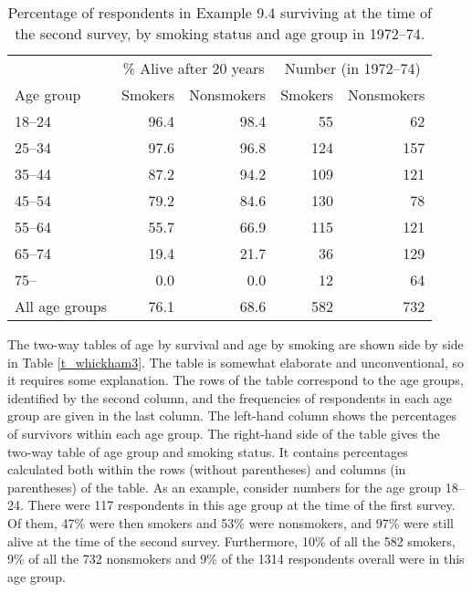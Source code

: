 \begin{table}[t]
\caption{Percentage of respondents in Example 9.4
surviving at the time of the second survey, by
smoking status and age group in 1972--74.}
\label{t_whickham2}
\begin{center}
\begin{tabular}{|l|rr|rr|}\hline
& \multicolumn{2}{|c|}{\% Alive after 20 years} &
 \multicolumn{2}{|c|}{Number (in 1972--74)} \\
Age group & Smokers & Nonsmokers & Smokers & Nonsmokers \\ \hline
18--24 & 96.4 & 98.4 & 55 & 62 \\
25--34 & 97.6 & 96.8 & 124 & 157 \\
35--44 & 87.2 & 94.2 & 109 & 121 \\
45--54 & 79.2 & 84.6 & 130 & 78 \\
55--64 & 55.7 & 66.9 & 115 & 121 \\
65--74 & 19.4 & 21.7 & 36 & 129 \\
75-- & 0.0 & 0.0 & 12 & 64 \\
\hline
All age groups & 76.1 & 68.6 & 582 & 732 \\ \hline
\end{tabular}
\end{center}
\vspace*{-2ex}
\end{table}

The two-way tables of age by survival and age by smoking are shown side
by side in Table \ref{t_whickham3}. The table is somewhat elaborate and
unconventional, so it requires some explanation. The rows of the table
correspond to the age groups, identified by the second column, and the
frequencies of respondents in each age group are given in the last
column. The left-hand column shows the percentages of survivors within
each age group. The right-hand side of the table gives the two-way table
of age group and smoking status. It contains percentages calculated both
within the rows (without parentheses) and columns (in parentheses) of
the table. As an example, consider numbers for the age group 18--24.
There were 117 respondents in this age group at the time of the first
survey. Of them, 47\% were then smokers and 53\% were nonsmokers, and
97\% were still alive at the time of the second survey. Furthermore,
10\% of all the 582 smokers, 9\% of all the 732 nonsmokers and 9\% of
the 1314 respondents overall were in this age group.

